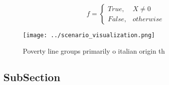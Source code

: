 \documentclass[a4paper]{article}
\begin{document}
\begin{equation}   f =
\begin{cases} True, & X \neq 0\\
False, & otherwise
\end{cases}
\end{equation}

\begin{figure}
\centering
\texttt{[image: ../scenario\_visualization.png]}
\caption{Poverty line groups primarily o italian origin th
}
\end{figure}
 
\subsection{SubSection}
\end{document}
